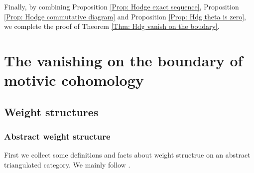 \documentclass[11pt, a4paper]{amsart}
\theoremstyle{plain}
\theoremstyle{definition}
\numberwithin{equation}{section}
\begin{document}
Finally, by combining Proposition \ref{Prop: Hodge exact sequence}, Proposition \ref{Prop: Hodge commutative diagram} and Proposition \ref{Prop: Hdg theta is zero}, we complete the proof of Theorem \ref{Thm: Hdg vanish on the boudary}.  



\section{The vanishing on the boundary of motivic cohomology}
\label{Sec: vanishing on the boundary motivic}

\subsection{Weight structures}
\label{SS: weight structures}

\subsubsection{Abstract weight structure}
First we collect some definitions and facts about weight structrue on an abstract triangulated category. We mainly follow \cite[\S 1]{Wild_09}. 
\end{document}
